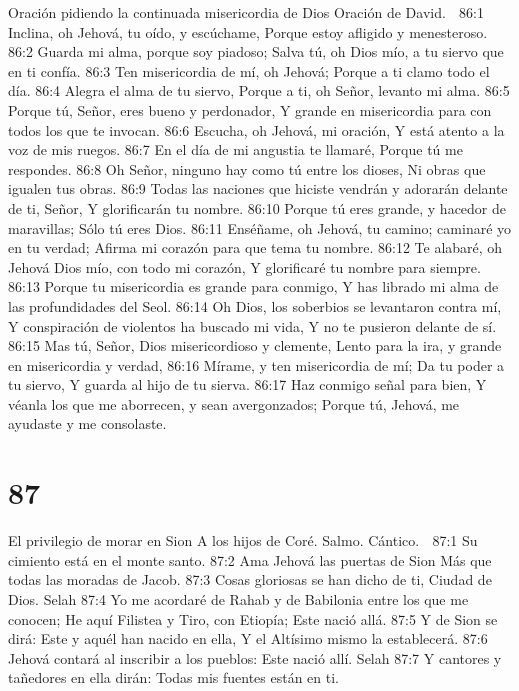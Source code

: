 Oración pidiendo la continuada misericordia de Dios 
Oración de David. 

86:1 Inclina, oh Jehová, tu oído, y escúchame, 
Porque estoy afligido y menesteroso. 
86:2 Guarda mi alma, porque soy piadoso; 
Salva tú, oh Dios mío, a tu siervo que en ti confía. 
86:3 Ten misericordia de mí, oh Jehová; 
Porque a ti clamo todo el día. 
86:4 Alegra el alma de tu siervo, 
Porque a ti, oh Señor, levanto mi alma. 
86:5 Porque tú, Señor, eres bueno y perdonador, 
Y grande en misericordia para con todos los que te invocan. 
86:6 Escucha, oh Jehová, mi oración, 
Y está atento a la voz de mis ruegos. 
86:7 En el día de mi angustia te llamaré, 
Porque tú me respondes. 
86:8 Oh Señor, ninguno hay como tú entre los dioses, 
Ni obras que igualen tus obras. 
86:9 Todas las naciones que hiciste vendrán y adorarán delante de ti, Señor, 
Y glorificarán tu nombre. 
86:10 Porque tú eres grande, y hacedor de maravillas; 
Sólo tú eres Dios. 
86:11 Enséñame, oh Jehová, tu camino; caminaré yo en tu verdad; 
Afirma mi corazón para que tema tu nombre. 
86:12 Te alabaré, oh Jehová Dios mío, con todo mi corazón, 
Y glorificaré tu nombre para siempre. 
86:13 Porque tu misericordia es grande para conmigo, 
Y has librado mi alma de las profundidades del Seol. 
86:14 Oh Dios, los soberbios se levantaron contra mí, 
Y conspiración de violentos ha buscado mi vida, 
Y no te pusieron delante de sí. 
86:15 Mas tú, Señor, Dios misericordioso y clemente, 
Lento para la ira, y grande en misericordia y verdad, 
86:16 Mírame, y ten misericordia de mí; 
Da tu poder a tu siervo, 
Y guarda al hijo de tu sierva. 
86:17 Haz conmigo señal para bien, 
Y véanla los que me aborrecen, y sean avergonzados; 
Porque tú, Jehová, me ayudaste y me consolaste. 

\chapter{87}

El privilegio de morar en Sion 
A los hijos de Coré. Salmo. Cántico. 

87:1 Su cimiento está en el monte santo. 
87:2 Ama Jehová las puertas de Sion 
Más que todas las moradas de Jacob. 
87:3 Cosas gloriosas se han dicho de ti, 
Ciudad de Dios. Selah 
87:4 Yo me acordaré de Rahab y de Babilonia entre los que me conocen; 
He aquí Filistea y Tiro, con Etiopía; 
Este nació allá. 
87:5 Y de Sion se dirá: Este y aquél han nacido en ella, 
Y el Altísimo mismo la establecerá. 
87:6 Jehová contará al inscribir a los pueblos: 
Este nació allí. Selah 
87:7 Y cantores y tañedores en ella dirán: 
Todas mis fuentes están en ti. 

